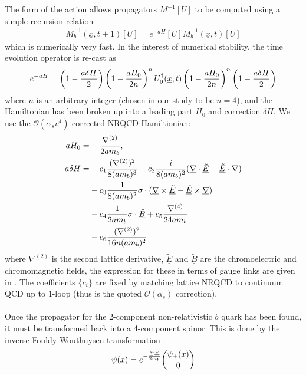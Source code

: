 The form of the action allows propagators $M^{-1}[U]$ to be computed using a simple recursion relation
\begin{align}
	M_b^{-1}(\underline{x},t+1)[U] = e^{-aH}[U] M^{-1}_b(\underline{x},t)[U] 
\end{align}
which is numerically very fast. In the interest of numerical stability, the time evolution operator is re-cast as
\begin{align}
	e^{-aH} = \left(1 - {a\delta H\over 2}\right)\left(1-{aH_0\over 2 n}\right)^n U_0^{\dagger}(\underline{x},t) \left(1 - {aH_0\over 2n}\right)^n \left(1-{a\delta H\over 2}\right)
\end{align}
where $n$ is an arbitrary integer (chosen in our study to be $n=4$), and the Hamiltonian has been broken up into a leading part $H_0$ and correction $\delta H$. We use the $\mathcal{O}(\alpha_s v^4)$ corrected NRQCD Hamiltionian:
\begin{align}
	aH_0 =& - {\nabla^{(2)}\over 2am_b} , \\
	\nonumber
	a\delta H =& - c_1 {(\nabla^{(2)})^2 \over 8 (am_b)^3} + c_2{ i\over 8(am_b)^2} ( \underline{\nabla}\cdot \underline{\tilde{E}} - \underline{\tilde{E}}\cdot \nabla) \\
	\nonumber
	& - c_3 {1\over 8(am_b)^2} \sigma\cdot ( \underline{\nabla}\times\underline{\tilde{E}} - \underline{\tilde{E}}\times\underline{\nabla}) \\
	\nonumber
	& - c_4 {1\over 2am_b} \sigma\cdot \underline{\tilde{B}} + c_5 {\nabla^{(4)}\over 24 am_b} \\
	& - c_6 {(\nabla^{(2)})^2\over 16n (am_b)^2}
\end{align}
where $\nabla^{(2)}$ is the second lattice derivative, $\underline{\tilde{E}}$ and $\underline{\tilde{B}}$ are the chromoelectric and chromomagnetic fields, the expression for these in terms of gauge links are given in \cite{Gray:2005ur}. The coefficients $\{c_i\}$ are fixed by matching lattice NRQCD to continuum QCD up to 1-loop (thus is the quoted $\mathcal{O}(\alpha_s)$ correction).
\\ \\
Once the propagator for the 2-component non-relativistic $b$ quark has been found, it must be transformed back into a 4-component spinor. This is done by the inverse Fouldy-Wouthuysen transformation \cite{PhysRev.78.29}:
\begin{align}
	\psi(x) = e^{-{\underline{\gamma}\cdot\underline{\nabla}\over 2m_b}}\binom{\psi_+(x)}{0}
	\label{eq:FoldyWoldy}
\end{align}

